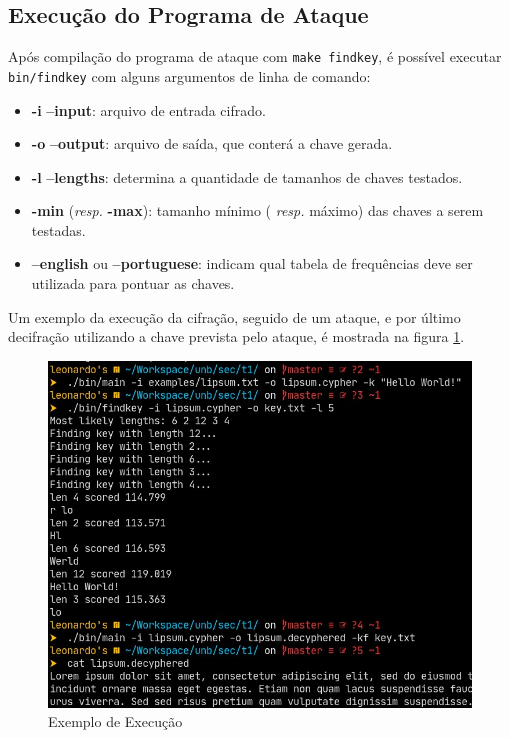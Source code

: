 \documentclass[conference]{IEEEtran}
\begin{document}
\subsection{Execução do Programa de Ataque}
\label{sec:exec-attack}

Após compilação do programa de ataque com \verb|make findkey|, é possível
executar \verb|bin/findkey| com alguns argumentos de linha de comando:

\begin{itemize}
    \item \textbf{-i} \textbf{--input}: arquivo de entrada cifrado.
    \item \textbf{-o} \textbf{--output}: arquivo de saída, que conterá a chave
        gerada.
    \item \textbf{-l} \textbf{--lengths}: determina a quantidade de tamanhos de
        chaves testados.
    \item \textbf{-min} (\textit{resp.} \textbf{-max}): tamanho mínimo (
        \textit{resp.} máximo) das chaves a serem testadas.
    \item \textbf{--english} ou \textbf{--portuguese}: indicam qual tabela de
        frequências deve ser utilizada para pontuar as chaves.
\end{itemize}

Um exemplo da execução da cifração, seguido de um ataque, e por último
decifração utilizando a chave prevista pelo ataque, é mostrada na figura
\ref{fig:example}.

\begin{figure}[htbp]
    \centerline{\includegraphics[width=\linewidth]{img/ss1.jpg}}
\caption{Exemplo de Execução}
\label{fig:example}
\end{figure}
\end{document}
